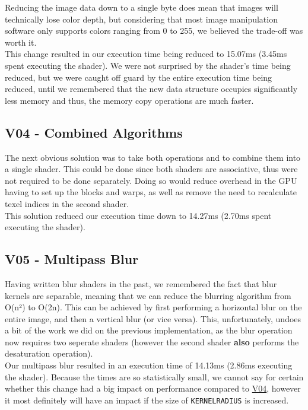 \documentclass[10pt,journal,compsoc]{IEEEtran}
\def\code#1{\texttt{#1}}
\begin{document}
\noindent Reducing the image data down to a single byte does mean that images will technically lose color depth, but considering that most image manipulation software only supports colors ranging from 0 to 255, we believed the trade-off was worth it. \\

\noindent This change resulted in our execution time being reduced to 15.07ms (3.45ms spent executing the shader). We were not surprised by the shader's time being reduced, but we were caught off guard by the entire execution time being reduced, until we remembered that the new data structure occupies significantly less memory and thus, the memory copy operations are much faster. \\


\subsection{V04 - Combined Algorithms}
\label{sec:V04}

\noindent The next obvious solution was to take both operations and to combine them into a single shader. This could be done since both shaders are associative, thus were not required to be done separately. Doing so would reduce overhead in the GPU having to set up the blocks and warps, as well as remove the need to recalculate texel indices in the second shader. \\

\noindent This solution reduced our execution time down to 14.27ms (2.70ms spent executing the shader).


\subsection{V05 - Multipass Blur}
\label{sec:V05}

\noindent Having written blur shaders in the past, we remembered the fact that blur kernels are separable\cite{multipassblur}, meaning that we can reduce the blurring algorithm from O(n²) to O(2n). This can be achieved by first performing a horizontal blur on the entire image, and then a vertical blur (or vice versa). This, unfortunately, undoes a bit of the work we did on the previous implementation, as the blur operation now requires two seperate shaders (however the second shader \textbf{also} performs the desaturation operation).\\

\noindent Our multipass blur resulted in an execution time of 14.13ms (2.86ms executing the shader). Because the times are so statistically small, we cannot say for certain whether this change had a big impact on performance compared to \hyperref[sec:V04]{V04}, however it most definitely will have an impact if the size of \code{KERNELRADIUS} is increased. \\
\end{document}
